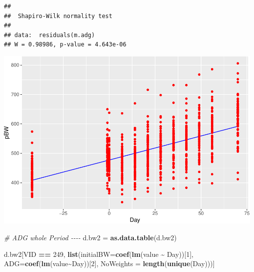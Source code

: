 \documentclass[
]{book}
\newenvironment{Shaded}{\begin{snugshade}}{\end{snugshade}}
\newcommand{\AttributeTok}[1]{\textcolor[rgb]{0.13,0.29,0.53}{#1}}
\newcommand{\CommentTok}[1]{\textcolor[rgb]{0.56,0.35,0.01}{\textit{#1}}}
\newcommand{\DecValTok}[1]{\textcolor[rgb]{0.00,0.00,0.81}{#1}}
\newcommand{\FunctionTok}[1]{\textcolor[rgb]{0.13,0.29,0.53}{\textbf{#1}}}
\newcommand{\NormalTok}[1]{#1}
\newcommand{\OtherTok}[1]{\textcolor[rgb]{0.56,0.35,0.01}{#1}}
\newcommand{\SpecialCharTok}[1]{\textcolor[rgb]{0.81,0.36,0.00}{\textbf{#1}}}
\newcommand{\StringTok}[1]{\textcolor[rgb]{0.31,0.60,0.02}{#1}}
\begin{document}
\begin{verbatim}
## 
##  Shapiro-Wilk normality test
## 
## data:  residuals(m.adg)
## W = 0.98986, p-value = 4.643e-06
\end{verbatim}

\begin{Shaded}
\end{Shaded}

\includegraphics{bookdown-demo_files/figure-latex/unnamed-chunk-5-2.pdf}

\begin{Shaded}
\begin{Highlighting}[]
\CommentTok{\# ADG whole Period {-}{-}{-}{-}}
\NormalTok{d.bw2 }\OtherTok{=} \FunctionTok{as.data.table}\NormalTok{(d.bw2)}

\NormalTok{d.bw2[VID }\SpecialCharTok{==} \StringTok{\textquotesingle{}249\textquotesingle{}}\NormalTok{, }\FunctionTok{list}\NormalTok{(}\AttributeTok{initialBW=}\FunctionTok{coef}\NormalTok{(}\FunctionTok{lm}\NormalTok{(value }\SpecialCharTok{\textasciitilde{}}\NormalTok{ Day))[}\DecValTok{1}\NormalTok{], }
                         \AttributeTok{ADG=}\FunctionTok{coef}\NormalTok{(}\FunctionTok{lm}\NormalTok{(value}\SpecialCharTok{\textasciitilde{}}\NormalTok{Day))[}\DecValTok{2}\NormalTok{],}
                         \AttributeTok{NoWeights =} \FunctionTok{length}\NormalTok{(}\FunctionTok{unique}\NormalTok{(Day)))]}
\end{Highlighting}
\end{Shaded}
\end{document}
